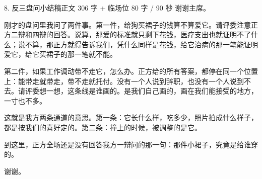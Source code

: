 \documentclass[script,con]{debate}
\begin{document}
\begin{speech}{8. 反三盘问小结稿}{正文 306 字 + 临场位 80 字 / 90 秒}
谢谢主席。

刚才的盘问里我问了两件事。第一件，给狗买裙子的钱算不算爱它。请评委注意正方二辩和四辩的回答。说算，那爱的标准就只剩下花钱，医疗支出也就证明不了什么；说不算，那正方就得告诉我们，凭什么同样是花钱，给它治病的那一笔能证明爱它，给它买裙子的那一笔就不能。

第二件，如果工作调动带不走它，怎么办。正方给的所有答案，都停在同一个位置上：能带走就带走，带不走就托付。没有一个人说到辞职，也没有一个人说到不去。请评委想一想，这条线是谁画的。是我们自己画的，画在我们能接受的地方，一寸也不多。

这就是我方两条通道的意思。第一条：它长什么样，吃多少，照片拍成什么样子，都是按我们的喜好定的。第二条：撞上的时候，被调整的是它。

到这里，正方全场还是没有回答我方一辩问的那一句：那件小裙子，究竟是给谁穿的。

谢谢。

\begin{contingency}
\end{contingency}
\end{speech}
\end{document}
